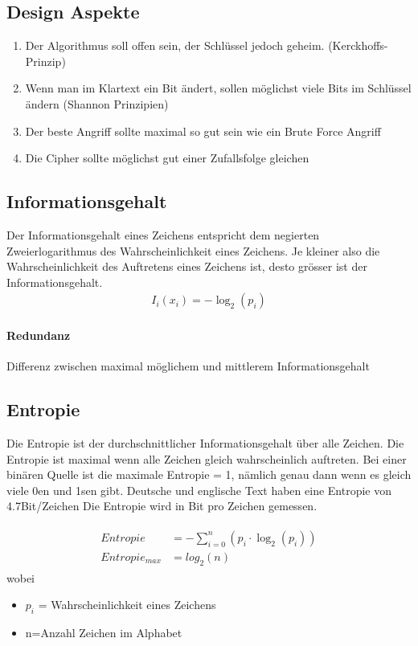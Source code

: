 \subsection{Design Aspekte}
\begin{enumerate}
	\item Der Algorithmus soll offen sein, der Schlüssel jedoch geheim.  (Kerckhoffs-Prinzip)
	\item Wenn man im Klartext ein Bit ändert, sollen möglichst viele Bits im Schlüssel ändern (Shannon Prinzipien)
	\item Der beste Angriff sollte maximal so gut sein wie ein Brute Force Angriff
	\item Die Cipher sollte möglichst gut einer Zufallsfolge gleichen
\end{enumerate}

\subsection{Informationsgehalt}
Der Informationsgehalt eines Zeichens entspricht dem negierten Zweierlogarithmus des Wahrscheinlichkeit eines Zeichens. Je kleiner also die Wahrscheinlichkeit des Auftretens eines Zeichens ist, desto grösser ist der Informationsgehalt. 
\begin{align}
I_i(x_i)=-\log_2(p_i)
\end{align}	
	
\paragraph{Redundanz}
 Differenz zwischen maximal möglichem und mittlerem Informationsgehalt

\subsection{Entropie}
Die Entropie ist der durchschnittlicher Informationsgehalt über alle Zeichen. Die Entropie ist maximal wenn alle Zeichen gleich wahrscheinlich auftreten. Bei einer binären Quelle ist die maximale Entropie = 1, nämlich genau dann wenn es gleich viele 0en und 1sen gibt. Deutsche und englische Text haben eine Entropie von 4.7Bit/Zeichen Die Entropie wird in Bit pro Zeichen gemessen.

\begin{align}
\begin{split}
Entropie &= -  \sum_{i=0}^n (p_i \cdot \log_2(p_i)) \\
Entropie_{max} &= log_2(n)
\end{split}
\end{align}
wobei
\begin{itemize}[label=]
	\item $p_i$ = Wahrscheinlichkeit eines Zeichens
	\item n=Anzahl Zeichen im Alphabet
\end{itemize}



